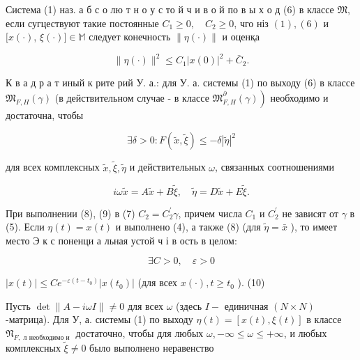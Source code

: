 \documentclass[10pt]{article}
\begin{document}
Система (1) наз. а б с о лю т н о у с то й ч и в о й по в ы х о д (6) в классе $\mathfrak{M}$, если сугцествуют такие постоянные $C_{1} \geqslant 0, \quad C_{2} \geqslant 0$, чго ніз $(1),(6)$ и $[x(\cdot)$, $\xi(\cdot)] \in \mathbb{M}$ следует конечность $\|\eta(\cdot)\|$ и оценқа



\[

\|\eta(\cdot)\|^{2} \leqslant C_{1}|x(0)|^{2}+\bar{C}_{2} .

\]



К в а д р а т иный к рите рий У. а.: для У. а. системы (1) по выходу (6) в классе $\mathfrak{M}_{F, H}(\gamma)$ (в действительном случае - в классе $\left.\mathfrak{M}_{F, H}^{\partial}(\gamma)\right)$ необходимо и достаточна, чтобы



\[

\exists \delta>0: F(\tilde{x}, \tilde{\xi}) \leqslant-\delta|\tilde{\eta}|^{2}

\]



для всех комплексных $\tilde{x}, \tilde{\xi}, \tilde{\eta}$ и действительных $\omega$, связанных соотношениями



\[

i \omega \tilde{x}=A \tilde{x}+B \tilde{\xi}, \quad \tilde{\eta}=D \tilde{x}+E \tilde{\xi} .

\]



При выполнении (8), (9) в (7) $C_{2}=C_{2}^{\prime} \gamma$, причем числа $C_{1}$ и $C_{2}^{\prime}$ не зависят от $\gamma$ в (5). Если $\eta(t)=x(t)$ и выполнено (4), а также (8) (для $\tilde{\eta}=\bar{x}$ ), то имеет место Э к с поненци а льная устой ч і в ость в целом:



\[

\exists C>0, \quad \varepsilon>0

\]



$|x(t)| \leqslant C e^{-\varepsilon\left(t-t_{0}\right)}\left|x\left(t_{0}\right)\right|$ (для всех $x(\cdot), t \geqslant t_{0}$ ). (10)



Пусть $\operatorname{det}\|A-i \omega I\| \neq 0$ для всех $\omega$ (здесь $I-$ единичная $(N \times N)$-матрица). Для У, а. системы (1) по выходу $\eta(t)=[x(t), \xi(t)]$ в классе $\mathfrak{N}_{F, \text { л необходимо и }}$ достаточно, чтобы для любых $\omega,-\infty \leqslant \omega \leqslant+\infty$, и любых комплексных $\widetilde{\xi} \neq 0$ было выполнено неравенство
\end{document}

